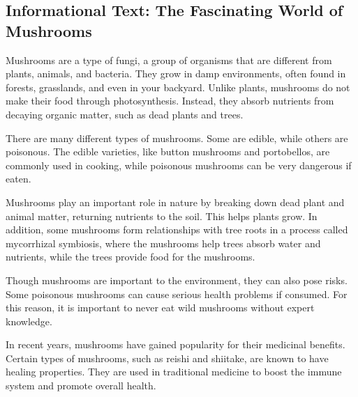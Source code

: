 \documentclass[12pt]{article}
\begin{document}
\onehalfspacing


\subsection*{Informational Text: The Fascinating World of Mushrooms}

\begin{tcolorbox}[colframe=black!40, colback=gray!5]

\begin{spacing}{1.15}
    Mushrooms are a type of fungi, a group of organisms that are different from plants, animals, and bacteria. They grow in damp environments, often found in forests, grasslands, and even in your backyard. Unlike plants, mushrooms do not make their food through photosynthesis. Instead, they absorb nutrients from decaying organic matter, such as dead plants and trees.

    There are many different types of mushrooms. Some are edible, while others are poisonous. The edible varieties, like button mushrooms and portobellos, are commonly used in cooking, while poisonous mushrooms can be very dangerous if eaten.

    Mushrooms play an important role in nature by breaking down dead plant and animal matter, returning nutrients to the soil. This helps plants grow. In addition, some mushrooms form relationships with tree roots in a process called mycorrhizal symbiosis, where the mushrooms help trees absorb water and nutrients, while the trees provide food for the mushrooms.

    Though mushrooms are important to the environment, they can also pose risks. Some poisonous mushrooms can cause serious health problems if consumed. For this reason, it is important to never eat wild mushrooms without expert knowledge.

    In recent years, mushrooms have gained popularity for their medicinal benefits. Certain types of mushrooms, such as reishi and shiitake, are known to have healing properties. They are used in traditional medicine to boost the immune system and promote overall health.

\end{spacing}

\end{tcolorbox}

\vspace{0.2cm}
\end{document}
